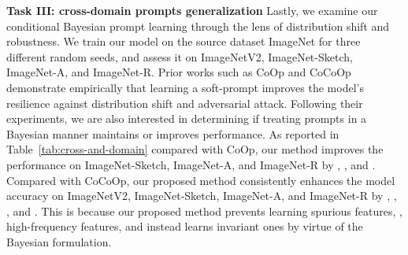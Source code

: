 \documentclass[10pt,twocolumn,letterpaper]{article}
\newcommand{\coop}{CoOp } \newcommand{\coopvpt}{CoOp+VPT } \newcommand{\cocoop}{CoCoOp } \newcommand{\cocoopvpt}{CoCoOp+VPT }
\begin{document}
\textbf{Task III: cross-domain prompts generalization}
Lastly, we examine our conditional Bayesian prompt learning through the lens of distribution shift and robustness. We train our model on the source dataset ImageNet for three different random seeds, and assess it on ImageNetV2, ImageNet-Sketch, ImageNet-A, and ImageNet-R. Prior works such as \coop \cite{zhou2022learning} and \cocoop \cite{zhou2022conditional} demonstrate empirically that learning a soft-prompt improves the model's resilience against distribution shift and adversarial attack. Following their experiments, we are also interested in determining if treating prompts in a Bayesian manner maintains or improves performance. 
As reported in Table~\ref{tab:cross-and-domain} compared with CoOp, our method improves the performance on ImageNet-Sketch, ImageNet-A, and ImageNet-R by , , and . Compared with CoCoOp, our proposed method consistently enhances the model accuracy on ImageNetV2, ImageNet-Sketch, ImageNet-A, and ImageNet-R by , , , and . This is because our proposed method prevents learning spurious features, \eg, high-frequency features, and instead learns invariant ones by virtue of the Bayesian formulation.

\begin{table}[t]
\centering
\caption{\textbf{In-domain performance.} CoOp provides the best in-domain performance, but suffers from distribution shifts. Our proposal provides the best trade-off.}
\vspace{-2mm}
\label{tab:in_domain}
\vspace{-1em}
\end{table}
\end{document}
